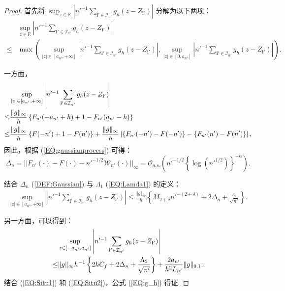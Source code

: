 \documentclass[a4paper,openay,14pt]{ctexbook}
\numberwithin{equation}{section}
\numberwithin{lem}{section}
\begin{document}
\begin{proof}
首先将 $\sup_{z\in\mathbb{R}}\left\vert n'^{-1}\sum_{\mathbf{i}' \in\mathcal{I}_{n'}}g_h(z-Z_{\mathbf{i}'})\right\vert$ 分解为以下两项：
\begin{align*}
     &\sup_{z\in\mathbb{R}}\left\vert n'^{-1}\sum_{\mathbf{i}' \in\mathcal{I}_{n'}}g_h(z-Z_{\mathbf{i}'})\right\vert\\
     \leq& \max\left(\sup_{\vert z\vert\in\left[a_{n'},+\infty\right]}\left\vert n'^{-1}\sum_{\mathbf{i}'\in\mathcal{I}_{n'}}g_h(z-Z_{\mathbf{i}'})\right\vert,
    \sup_{\vert z\vert\in\left[0,a_{n'}\right]}\left\vert n'^{-1}\sum_{\mathbf{i}'\in\mathcal{I}_{n'}}g_h(z-Z_{\mathbf{i}'})\right\vert\right).
\end{align*}

一方面，
\begin{align*}
    &\sup_{\vert z\vert\in\left[a_{n'},+\infty\right]}\left\vert n'^{-1}\sum_{\mathbf{i}'\in\mathcal{I}_{n'}}g_h(z-Z_{\mathbf{i}'})\right\vert  \\
    \leq &\frac{\Vert g\Vert_{\infty}}{h}\left\{F_{n'}(-a_{n'}+h)+1-F_{n'}(a_{n'}-h)\right\} \notag\\
    \leq &\frac{\Vert g\Vert_{\infty}}{h}\left\{F(-n')+1-F(n')\right\} + \frac{\Vert g\Vert_{\infty}}{h}\left\vert\left\{F_{n'}(-n')-F(-n')\right \}-\left \{F_{n'}(n')-F(n')\right\} \right\vert,
\end{align*}
因此，根据 (\ref{EQ:gaussianprocess}) 可得：
\begin{equation} \label{DEF:Gaussian}
\Delta_n=||F_{n'}(\cdot)-F(\cdot)-n'^{-1/2}\mathcal{W}_{n'}(\cdot)||_{\infty} =\mathcal{O}_{a.s.}\left(n'^{-1/2}\left\{\log (n'^{1/2})\right\}^{-\alpha}\right).
\end{equation}

结合 $\Delta_n$ (\ref{DEF:Gaussian}) 与 $\Lambda_1$ (\ref{EQ:Lamda1}) 的定义：
\begin{align} \label{EQ:Situ1}
    \sup_{\vert z\vert\in\left[a_{n'},+\infty\right]}\left\vert n'^{-1}\sum_{\mathbf{i}'\in\mathcal{I}_{n'}}g_h(z-Z_{\mathbf{i}'})\right\vert \leq \frac{\Vert g\Vert_{\infty}}{h}\left\{M_{2+\delta}n'^{-(2+\delta)} + 2\Delta_n + \frac{\Lambda_1}{\sqrt{n'}}\right\}.
\end{align}

另一方面，可以得到：
\begin{align} \label{EQ:Situ2}
    &\sup_{z\in\left[-a_{n'},a_{n'}\right]}\left\vert n'^{-1}\sum_{\mathbf{i}'\in\mathcal{I}_{n'}}g_h(z-Z_{\mathbf{i}'})\right\vert \notag\\
    \leq &\Vert g\Vert_{\infty}h^{-1}\left\{2hC_f + 2\Delta_n + \frac{\Lambda_2}{\sqrt{n'}}\right\} + \frac{2a_{n'}}{h^2L_{n'}}\Vert g\Vert_{0,1}.
\end{align}
结合 (\ref{EQ:Situ1}) 和 (\ref{EQ:Situ2})，公式 (\ref{EQ:g_h}) 得证.


\end{proof}
\end{document}
